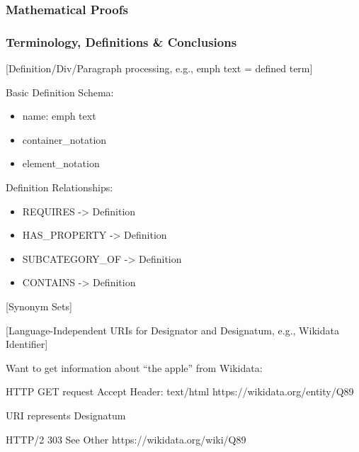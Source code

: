 \documentclass[
  british,
]{article}
\newenvironment{Shaded}{\begin{snugshade}}{\end{snugshade}}
\newcommand{\NormalTok}[1]{\textcolor[rgb]{0.00,0.23,0.31}{#1}}
\providecommand{\tightlist}{%
  \setlength{\itemsep}{0pt}\setlength{\parskip}{0pt}}
\begin{document}
\subsubsection{Mathematical Proofs}\label{mathematical-proofs}

\subsubsection{Terminology, Definitions \&
Conclusions}\label{terminology-definitions-conclusions}

{[}Definition/Div/Paragraph processing, e.g., emph text = defined
term{]}

Basic Definition Schema:

\begin{itemize}
\tightlist
\item
  name: emph text
\item
  container\_notation
\item
  element\_notation
\end{itemize}

Definition Relationships:

\begin{itemize}
\tightlist
\item
  REQUIRES -\textgreater{} Definition
\item
  HAS\_PROPERTY -\textgreater{} Definition
\item
  SUBCATEGORY\_OF -\textgreater{} Definition
\item
  CONTAINS -\textgreater{} Definition
\end{itemize}

{[}Synonym Sets{]}

{[}Language-Independent URIs for Designator and Designatum, e.g.,
Wikidata Identifier{]}

Want to get information about ``the apple'' from Wikidata:

\begin{Shaded}
\begin{Highlighting}[]
\NormalTok{HTTP GET request}
\NormalTok{Accept Header: text/html}
\NormalTok{https://wikidata.org/entity/Q89}
\end{Highlighting}
\end{Shaded}

URI represents Designatum

\begin{Shaded}
\begin{Highlighting}[]
\NormalTok{HTTP/2 303 See Other}
\NormalTok{https://wikidata.org/wiki/Q89}
\end{Highlighting}
\end{Shaded}
\end{document}
